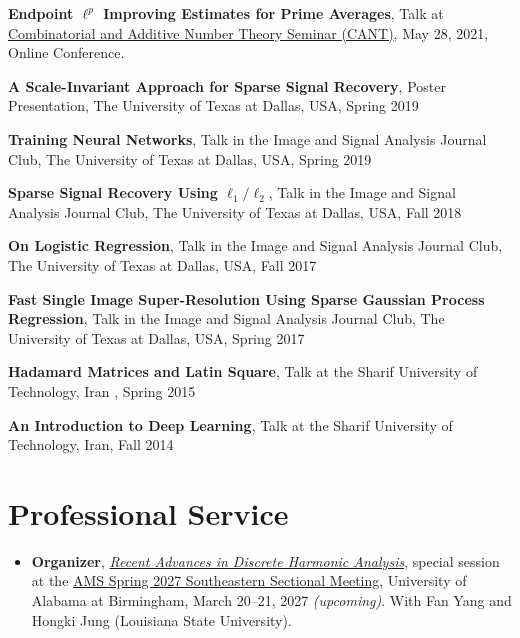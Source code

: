 \documentclass[11pt]{article}
\newenvironment{innerlist}[1][\enskip\textbullet]
        {\begin{compactitem}[#1]}{\end{compactitem}}
\begin{document}
\begin{innerlist}[-]
\item {\bf Endpoint $\ell^p$ Improving Estimates for Prime Averages}, Talk at \href{https://www.theoryofnumbers.com/cant/CANT2021-program.pdf}{Combinatorial and Additive Number Theory Seminar (CANT)}, May 28, 2021, Online Conference.
\item  {\bf A Scale-Invariant Approach for Sparse Signal Recovery}, Poster Presentation, The University of Texas at Dallas, USA, Spring 2019
\item {\bf Training Neural Networks}, Talk in the Image and Signal Analysis Journal Club, The University of Texas at Dallas, USA, Spring 2019
\item{{\bf Sparse Signal Recovery Using $\ell_1/\ell_2 $}, Talk in the Image and Signal Analysis Journal Club, The University of Texas at Dallas, USA, Fall 2018}
\item{{\bf On Logistic Regression}, Talk in the Image and Signal Analysis Journal Club, The University of Texas at Dallas, USA, Fall 2017}
\item{{\bf Fast Single Image Super-Resolution Using Sparse Gaussian Process Regression}, Talk in the Image and Signal Analysis Journal Club, The University of Texas at Dallas, USA, Spring 2017}
\item{{\bf Hadamard Matrices and Latin Square}, Talk at the Sharif University of Technology, Iran , Spring 2015}
\item{{\bf An Introduction to Deep Learning}, Talk at the Sharif University of Technology, Iran, Fall 2014}
\end{innerlist}







\section{Professional Service}
\vspace{2 mm}
\begin{itemize}
\item \textbf{Organizer}, \href{https://yaghoub-rahimi.github.io/ams-2027.html}{\textit{Recent Advances in Discrete Harmonic Analysis}}, special session at the \href{https://meetings.ams.org/math/spring2027se/meetingapp.cgi/Home/0}{AMS Spring 2027 Southeastern Sectional Meeting}, University of Alabama at Birmingham, March 20--21, 2027 \textit{(upcoming)}.
\newline
With Fan Yang and Hongki Jung (Louisiana State University).
\end{itemize}
\end{document}
